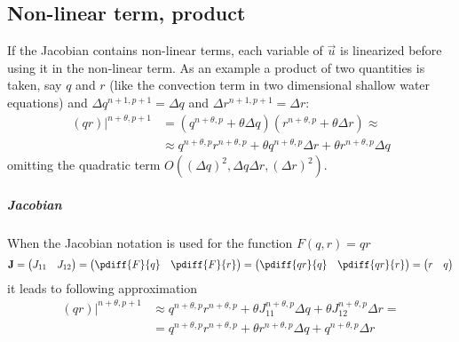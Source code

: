 \subsection{Non-linear term, product}\label{sec:jacobians_with_non_linear_product_term}
If the Jacobian contains non-linear terms, each variable of $\vec{u}$ is linearized before using it in the non-linear term.
As an example a product of two quantities is taken, say $q$ and $r$ (like the convection term in two dimensional shallow water equations) and  $\Delta q^{n+1, p+1} = \Delta q$ and  $\Delta r^{n+1, p+1} = \Delta r$:
\begin{align}
    \left.(qr)\right|^{n+\theta, p+1} & = \left( q^{n+\theta, p} + \theta  \Delta q \right) \left( r^{n+\theta, p} + \theta  \Delta r\right) \approx
    \\
    & \approx  q^{n+\theta, p} r^{n+\theta, p} + \theta q^{n+\theta, p} \Delta r + \theta r^{n+\theta, p} \Delta q
\end{align}
omitting the quadratic term $O((\Delta q)^2, \Delta q \Delta r, (\Delta r)^2)$.
\subparagraph*{Jacobian}
When the Jacobian notation is  used for the function $F(q,r) = qr$
\begin{align}
    \mat{J} =
    \begin{pmatrix}
        J_{11} & J_{12}
    \end{pmatrix}
    =
    \begin{pmatrix}
        \pdiff{F}{q} & \pdiff{F}{r}
    \end{pmatrix}
    =
    \begin{pmatrix}
        \pdiff{qr}{q} & \pdiff{qr}{r}
    \end{pmatrix}
    =
    \begin{pmatrix}
        r & q
    \end{pmatrix}
\end{align}
 it leads to following approximation
\begin{align}
    \left.(qr)\right|^{n+\theta, p+1} &  \approx  q^{n+\theta, p} r^{n+\theta, p}+ \theta J_{11}^{n+\theta, p} \Delta q + \theta J_{12}^{n+\theta, p} \Delta r =
    \\
    & = q^{n+\theta, p} r^{n+\theta, p}+ \theta r^{n+\theta, p} \Delta q + q^{n+\theta, p} \Delta r
\end{align}

